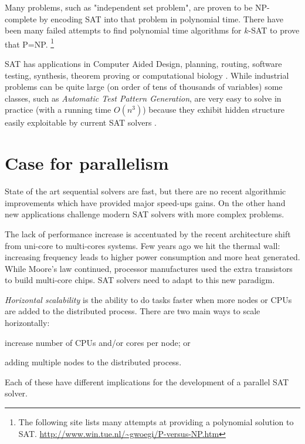 Many problems, such as "independent set problem", are proven to be
NP-complete by encoding SAT into that problem in polynomial time.
There have been many failed attempts to find polynomial time
algorithms for $k$-SAT to prove that P=NP.  \footnote{The following
site lists many attempts at providing a polynomial solution to
SAT. \url{http://www.win.tue.nl/~gwoegi/P-versus-NP.htm}}

SAT has applications in Computer Aided Design, planning, routing,
software testing, synthesis, theorem proving or computational
biology \cite{Smith_diagnosis, Soeken:2010:VUM:1870926.1871248,
demoura2008z3, Corblin07asat-based}. While industrial problems
can be quite large (on order of tens of thousands of variables)
some classes, such as \emph{Automatic Test Pattern Generation},
are very easy to solve in practice (with a running time $O(n^3)$)
because they exhibit hidden structure easily exploitable by current
SAT solvers \cite{Prasad:1999:WAE:309847.309857}.



\section{Case for parallelism}

State of the art sequential solvers are fast, but there are no
recent algorithmic improvements which have provided major speed-ups
gains. On the other hand new applications challenge modern SAT
solvers with more complex problems.

The lack of performance increase is accentuated by the recent
architecture shift from uni-core to multi-cores systems. Few
years ago we hit the thermal wall: increasing frequency leads to
higher power consumption and more heat generated. While Moore's law
continued, processor manufactures used the extra transistors to build
multi-core chips.  SAT solvers need to adapt to this new paradigm.

\emph{Horizontal scalability} is the ability to do tasks faster
when more nodes or CPUs are added to the distributed process. There
are two main ways to scale horizontally:
\begin{inparaenum}[a)]
  \item increase number of CPUs and/or cores per node; or
  \item adding multiple nodes to the distributed process.
\end{inparaenum} Each of these have different implications
for the development of a parallel SAT solver.

